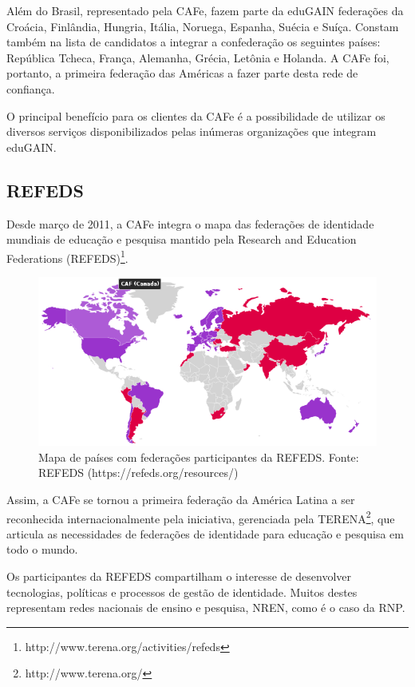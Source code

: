 Além do Brasil, representado pela CAFe, fazem parte da eduGAIN federações da Croácia, Finlândia, Hungria, Itália, Noruega, Espanha, Suécia e Suíça. Constam também na lista de candidatos a integrar a confederação os seguintes países: República Tcheca, França, Alemanha, Grécia, Letônia e Holanda. A CAFe foi, portanto, a primeira federação das Américas a fazer parte desta rede de confiança.

O principal benefício para os clientes da CAFe é a possibilidade de utilizar os diversos serviços disponibilizados pelas inúmeras organizações que integram eduGAIN.

\subsection{REFEDS}

Desde março de 2011, a CAFe integra o mapa das federações de identidade mundiais de educação e pesquisa mantido pela Research and Education Federations (REFEDS)\footnote{http://www.terena.org/activities/refeds}.

\begin{figure}[!htpb]
 \centering
 \includegraphics[width=1\textwidth]{figuras/cafe-refeds.png}
 \caption{Mapa de países com federações participantes da REFEDS. Fonte: REFEDS (https://refeds.org/resources/)}
 \label{fig_7}
\end{figure}

Assim, a CAFe se tornou a primeira federação da América Latina a ser reconhecida internacionalmente pela iniciativa, gerenciada pela \ac{TERENA}\footnote{http://www.terena.org/}, que articula as necessidades de federações de identidade para educação e pesquisa em todo o mundo.

Os participantes da REFEDS compartilham o interesse de desenvolver tecnologias, políticas e processos de gestão de identidade. Muitos destes representam redes nacionais de ensino e pesquisa, \ac{NREN}, como é o caso da RNP.